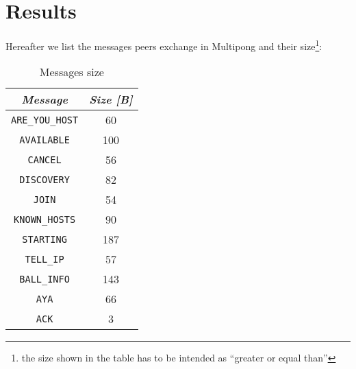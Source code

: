 \section{Results}

Hereafter we list the messages peers exchange in Multipong and their
size\footnote{the size shown in the table has to be intended as ``greater or
equal than''}:

\begin{table}[H]
  \centering
  \begin{tabular}{cc}
    \textbf{\textit{Message}} & \textbf{\textit{Size [B]}} \\
    \hline
    \texttt{ARE\_YOU\_HOST} & 60 \\
    \hline
    \texttt{AVAILABLE} & 100 \\
    \hline
    \texttt{CANCEL} & 56 \\
    \hline
    \texttt{DISCOVERY} & 82 \\
    \hline
    \texttt{JOIN} & 54 \\
    \hline
    \texttt{KNOWN\_HOSTS} & 90 \\
    \hline
    \texttt{STARTING} & 187 \\
    \hline
    \texttt{TELL\_IP} & 57 \\
    \hline
    \texttt{BALL\_INFO} & 143 \\
    \hline
    \texttt{AYA} & 66 \\
    \hline
    \texttt{ACK} & 3 \\
    \hline
  \end{tabular}
  \caption{Messages size}
  \label{tab:sizes}
\end{table}



